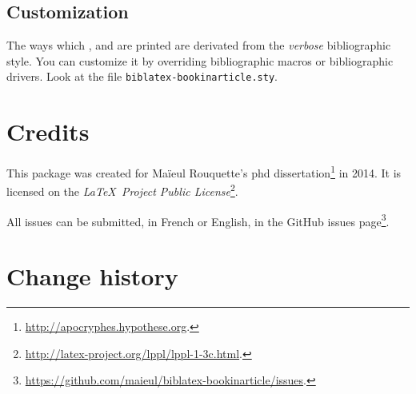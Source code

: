 \documentclass{ltxdockit}[2011/03/25]
\begin{document}
\subsection{Customization}

The ways which ,  and  are printed are derivated from the \emph{verbose} bibliographic style. You can customize it by overriding bibliographic macros or bibliographic drivers. Look at the file \verb+biblatex-bookinarticle.sty+.

\section{Credits}

This package was created for Maïeul Rouquette's phd dissertation\footnote{\url{http://apocryphes.hypothese.org}.} in 2014. It is licensed on the \emph{\LaTeX\ Project Public License}\footnote{\url{http://latex-project.org/lppl/lppl-1-3c.html}.}. 


All issues can be submitted, in French or English, in the GitHub issues page\footnote{\url{https://github.com/maieul/biblatex-bookinarticle/issues}.}.


\section{Change history}
\end{document}
